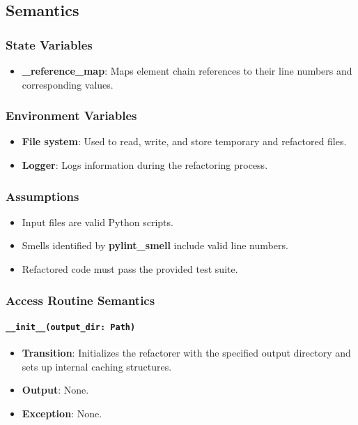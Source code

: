 \documentclass[12pt, titlepage]{article}
\begin{document}
\subsection{Semantics}

\subsubsection{State Variables}

\begin{itemize}
  \item \textbf{\_reference\_map}: Maps element chain references to their line numbers and corresponding values.
\end{itemize}

\subsubsection{Environment Variables}

\begin{itemize}
  \item \textbf{File system}: Used to read, write, and store temporary and refactored files.
  \item \textbf{Logger}: Logs information during the refactoring process.
\end{itemize}

\subsubsection{Assumptions}

\begin{itemize}
  \item Input files are valid Python scripts.
  \item Smells identified by \textbf{pylint\_smell} include valid line numbers.
  \item Refactored code must pass the provided test suite.
\end{itemize}

\subsubsection{Access Routine Semantics}

\paragraph{\texttt{\_\_init\_\_(output\_dir: Path)}}
\begin{itemize}
\item \textbf{Transition}: Initializes the refactorer with the specified output directory and sets up internal caching structures.
\item \textbf{Output}: None.
\item \textbf{Exception}: None.
\end{itemize}
\end{document}
